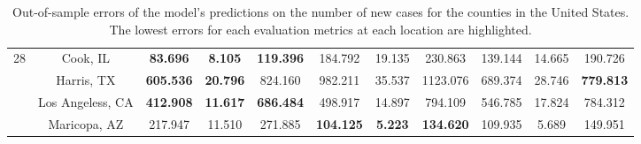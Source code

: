 \begin{landscape}
\begin{table}[!htb]
\begin{tabular}{| c | c | c | c | c | c | c | c | c | c | c |}
        \multirow{4}{*}{28}
            & Cook, IL & \textbf{83.696} & \textbf{8.105} & \textbf{119.396} & 184.792 & 19.135 & 230.863 & 139.144 & 14.665 & 190.726 \\
            & Harris, TX & \textbf{605.536} & \textbf{20.796} & 824.160 & 982.211 & 35.537 & 1123.076 & 689.374 & 28.746 & \textbf{779.813} \\
            & Los Angeless, CA & \textbf{412.908} & \textbf{11.617} & \textbf{686.484} & 498.917 & 14.897 & 794.109 & 546.785 & 17.824 & 784.312 \\
            & Maricopa, AZ & 217.947 & 11.510 & 271.885 & \textbf{104.125} & \textbf{5.223} & \textbf{134.620} & 109.935 & 5.689 & 149.951 \\ \hline
    \end{tabular}
    \caption{Out-of-sample errors of the model's predictions on the number of new cases for the counties in the United States. The lowest errors for each evaluation metrics at each location are highlighted.}
    \label{tab:errors-us-counties-new-cases}
\end{table}
\end{landscape}

